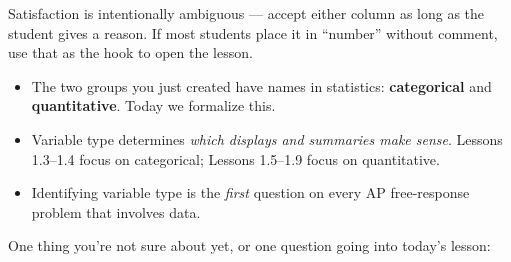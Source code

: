 \documentclass[10pt]{article}
\begin{document}
\begin{teachernote}
Satisfaction is intentionally ambiguous --- accept either column as long as the student gives a reason.
If most students place it in ``number'' without comment, use that as the hook to open the lesson.
\end{teachernote}

\vspace{0.14in}

\begin{tcolorbox}[colback=greenbg, colframe=greenacc, boxrule=0.8pt, arc=2mm,
    left=4mm, right=4mm, top=3mm, bottom=3mm]
\small
\begin{itemize}[leftmargin=1.3em, itemsep=6pt]
  \item The two groups you just created have names in statistics:
        \textbf{categorical} and \textbf{quantitative}. Today we formalize this.
  \item Variable type determines \emph{which displays and summaries make sense}.
        Lessons 1.3--1.4 focus on categorical; Lessons 1.5--1.9 focus on quantitative.
  \item Identifying variable type is the \emph{first} question on every AP free-response
        problem that involves data.
\end{itemize}
\end{tcolorbox}

\vspace{0.14in}

\noindent\textcolor{slate}{\small One thing you're not sure about yet, or one question going into today's lesson:}\\[6pt]
\end{document}
